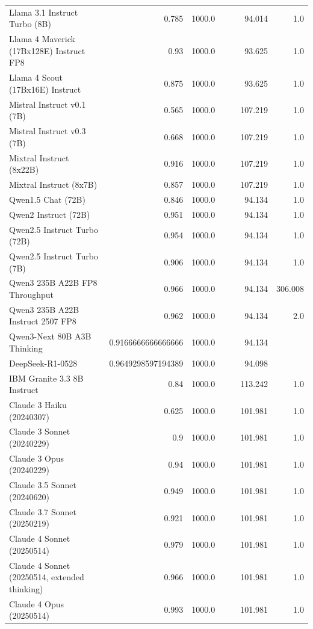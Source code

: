 \begin{table}[htp]
{\begin{tabular}{lrrrrrr}
Llama 3.1 Instruct Turbo (8B) & 0.785 & 1000.0 &  &  & 94.014 & 1.0 \\
Llama 4 Maverick (17Bx128E) Instruct FP8 & 0.93 & 1000.0 &  &  & 93.625 & 1.0 \\
Llama 4 Scout (17Bx16E) Instruct & 0.875 & 1000.0 &  &  & 93.625 & 1.0 \\
Mistral Instruct v0.1 (7B) & 0.565 & 1000.0 &  &  & 107.219 & 1.0 \\
Mistral Instruct v0.3 (7B) & 0.668 & 1000.0 &  &  & 107.219 & 1.0 \\
Mixtral Instruct (8x22B) & 0.916 & 1000.0 &  &  & 107.219 & 1.0 \\
Mixtral Instruct (8x7B) & 0.857 & 1000.0 &  &  & 107.219 & 1.0 \\
Qwen1.5 Chat (72B) & 0.846 & 1000.0 &  &  & 94.134 & 1.0 \\
Qwen2 Instruct (72B) & 0.951 & 1000.0 &  &  & 94.134 & 1.0 \\
Qwen2.5 Instruct Turbo (72B) & 0.954 & 1000.0 &  &  & 94.134 & 1.0 \\
Qwen2.5 Instruct Turbo (7B) & 0.906 & 1000.0 &  &  & 94.134 & 1.0 \\
Qwen3 235B A22B FP8 Throughput & 0.966 & 1000.0 &  &  & 94.134 & 306.008 \\
Qwen3 235B A22B Instruct 2507 FP8 & 0.962 & 1000.0 &  &  & 94.134 & 2.0 \\
Qwen3-Next 80B A3B Thinking & 0.9166666666666666 & 1000.0 &  &  & 94.134 &  \\
DeepSeek-R1-0528 & 0.9649298597194389 & 1000.0 &  &  & 94.098 &  \\
IBM Granite 3.3 8B Instruct & 0.84 & 1000.0 &  &  & 113.242 & 1.0 \\
Claude 3 Haiku (20240307) & 0.625 & 1000.0 &  &  & 101.981 & 1.0 \\
Claude 3 Sonnet (20240229) & 0.9 & 1000.0 &  &  & 101.981 & 1.0 \\
Claude 3 Opus (20240229) & 0.94 & 1000.0 &  &  & 101.981 & 1.0 \\
Claude 3.5 Sonnet (20240620) & 0.949 & 1000.0 &  &  & 101.981 & 1.0 \\
Claude 3.7 Sonnet (20250219) & 0.921 & 1000.0 &  &  & 101.981 & 1.0 \\
Claude 4 Sonnet (20250514) & 0.979 & 1000.0 &  &  & 101.981 & 1.0 \\
Claude 4 Sonnet (20250514, extended thinking) & 0.966 & 1000.0 &  &  & 101.981 & 1.0 \\
Claude 4 Opus (20250514) & 0.993 & 1000.0 &  &  & 101.981 & 1.0 \\

\end{tabular}}
\end{table}
